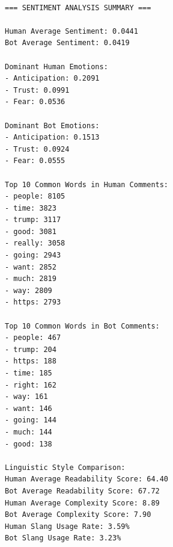 \documentclass[
  12pt,
  letterpaper,
  DIV=11,
  numbers=noendperiod]{scrartcl}
\begin{document}
\begin{verbatim}

=== SENTIMENT ANALYSIS SUMMARY ===

Human Average Sentiment: 0.0441
Bot Average Sentiment: 0.0419

Dominant Human Emotions:
- Anticipation: 0.2091
- Trust: 0.0991
- Fear: 0.0536

Dominant Bot Emotions:
- Anticipation: 0.1513
- Trust: 0.0924
- Fear: 0.0555

Top 10 Common Words in Human Comments:
- people: 8105
- time: 3823
- trump: 3117
- good: 3081
- really: 3058
- going: 2943
- want: 2852
- much: 2819
- way: 2809
- https: 2793

Top 10 Common Words in Bot Comments:
- people: 467
- trump: 204
- https: 188
- time: 185
- right: 162
- way: 161
- want: 146
- going: 144
- much: 144
- good: 138

Linguistic Style Comparison:
Human Average Readability Score: 64.40
Bot Average Readability Score: 67.72
Human Average Complexity Score: 8.89
Bot Average Complexity Score: 7.90
Human Slang Usage Rate: 3.59%
Bot Slang Usage Rate: 3.23%
\end{verbatim}
\end{document}
